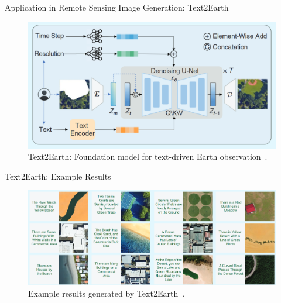 \begin{refsection}
  \begin{frame}{Application in Remote Sensing Image Generation: Text2Earth}
    \begin{figure}
      \centering
      \includegraphics[width=0.9\linewidth]{figs/text2earth.png}
      \caption[]{\scriptsize Text2Earth: Foundation model for text-driven Earth observation~\parencite{text2earth2025}.}
    \end{figure}
    \bottomleftrefs
  \end{frame}
\end{refsection}

\begin{refsection}
  \begin{frame}{Text2Earth: Example Results}
    \begin{figure}
      \centering
      \includegraphics[width=0.9\linewidth]{figs/text2earth_results.png}
      \caption[]{\scriptsize Example results generated by Text2Earth~\parencite{text2earth2025}.}
    \end{figure}
    \bottomleftrefs
  \end{frame}
\end{refsection}

